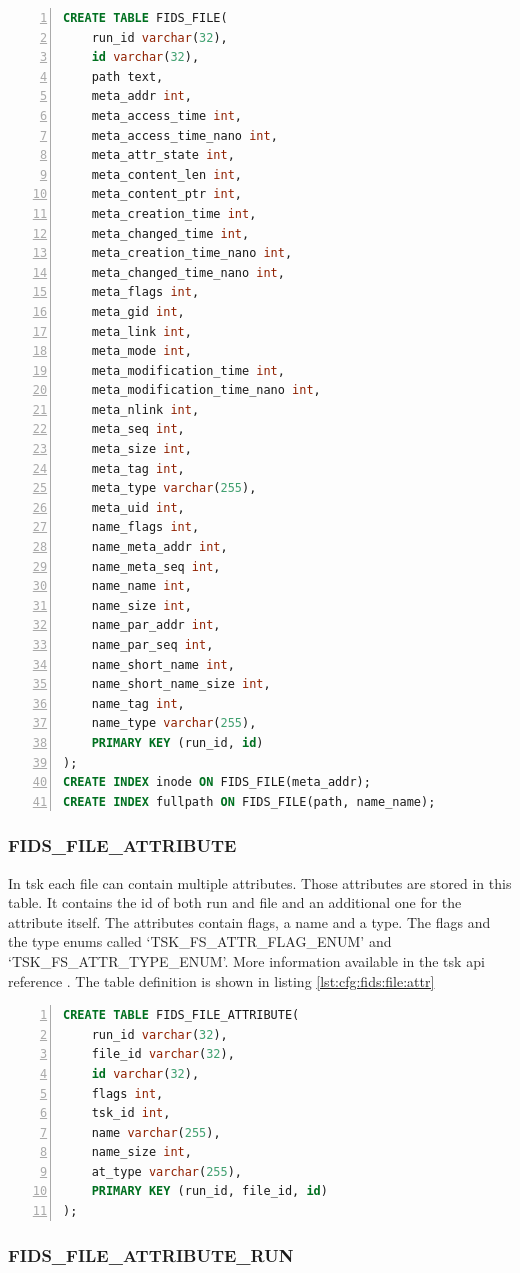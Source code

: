 \begin{lstlisting}[language=sql, numbers=left, caption=Fids File Table Definition, label=lst:cfg:fids:file]
CREATE TABLE FIDS_FILE(
	run_id varchar(32),
	id varchar(32),
	path text, 
	meta_addr int,
	meta_access_time int,
	meta_access_time_nano int,
	meta_attr_state int,
	meta_content_len int,
	meta_content_ptr int,
	meta_creation_time int,
	meta_changed_time int,
	meta_creation_time_nano int,
	meta_changed_time_nano int,
	meta_flags int,
	meta_gid int,
	meta_link int,
	meta_mode int,
	meta_modification_time int,
	meta_modification_time_nano int,
	meta_nlink int,
	meta_seq int,
	meta_size int,
	meta_tag int,
	meta_type varchar(255),
	meta_uid int,
	name_flags int,
	name_meta_addr int,
	name_meta_seq int,
	name_name int,
	name_size int,
	name_par_addr int,
	name_par_seq int,
	name_short_name int,
	name_short_name_size int,
	name_tag int,
	name_type varchar(255),
	PRIMARY KEY (run_id, id)
);
CREATE INDEX inode ON FIDS_FILE(meta_addr);
CREATE INDEX fullpath ON FIDS_FILE(path, name_name);
\end{lstlisting}

\subsubsection{FIDS\_FILE\_ATTRIBUTE}

In \gls{tsk} each file can contain multiple attributes. Those attributes are stored in this table. It contains the \gls{id} of both run and file and an additional one for the attribute itself. The attributes contain flags, a name and a type. The flags and the type enums called `TSK\_FS\_ATTR\_FLAG\_ENUM' and `TSK\_FS\_ATTR\_TYPE\_ENUM'. More information available in the \gls{tsk} \gls{api} reference \cite{tsk:attr:struct,tsk:file:header}. The table definition is shown in listing \ref{lst:cfg:fids:file:attr}

\begin{lstlisting}[language=sql, numbers=left, caption=Fids File Attribute Table Definition, label=lst:cfg:fids:file:attr]
CREATE TABLE FIDS_FILE_ATTRIBUTE(
	run_id varchar(32),
	file_id varchar(32),
	id varchar(32),
	flags int,
	tsk_id int,
	name varchar(255),
	name_size int,
	at_type varchar(255), 
	PRIMARY KEY (run_id, file_id, id)
);
\end{lstlisting}

\subsubsection{FIDS\_FILE\_ATTRIBUTE\_RUN}

